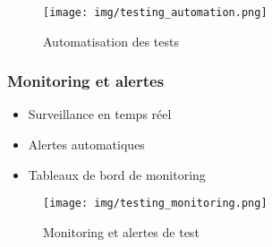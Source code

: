 \begin{figure}[H]
    \centering
    \texttt{[image: img/testing\_automation.png]}
    \caption{Automatisation des tests}
    \label{fig:testing_automation}
\end{figure}

\subsubsection{Monitoring et alertes}
\begin{itemize}
    \item Surveillance en temps réel
    \item Alertes automatiques
    \item Tableaux de bord de monitoring
\end{itemize}

\begin{figure}[H]
    \centering
    \texttt{[image: img/testing\_monitoring.png]}
    \caption{Monitoring et alertes de test}
    \label{fig:testing_monitoring}
\end{figure}